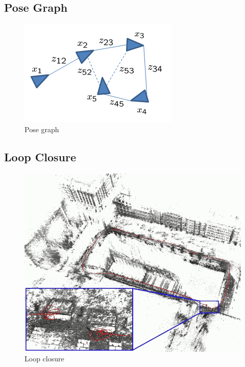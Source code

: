 \subsection{Pose Graph}%
\label{sub:pose-graph}

\begin{figure}[ht]
	\centering
	\includegraphics[width=\linewidth]{assets/img/pose-graph.png}
	\caption{Pose graph}%
	\label{fig:pose-graph}
\end{figure}

\subsection{Loop Closure}%
\label{sub:loop-closure}

\begin{figure}[ht]
	\centering
	\includegraphics[width=\linewidth]{assets/img/loop-closure-lowres.png}
	\caption{Loop closure}%
	\label{fig:loop-closure}
\end{figure}
